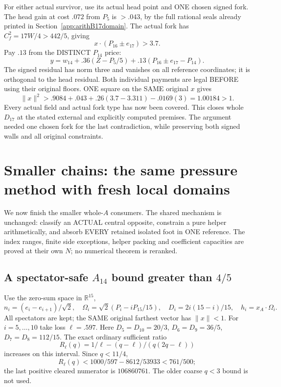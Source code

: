 \documentclass[11pt]{article}
\begin{document}
For either actual survivor, use its actual
head point and ONE chosen signed fork.
The head gain at cost \(.072\) from \(P_5\)
is \(>.043\), by the full rational seals already
printed in Section~\ref{app:arithB17domain}.
The actual fork has
\(C_f^2=17W/4>442/5\), giving
\[
                 x\cdot(P_{16}\pm e_{17})>3.7 .
\]
Pay \(.13\) from the DISTINCT \(P_{14}\) price:
\[
             y=w_{14}+.36(Z-P_5/5)
                          +.13(P_{16}\pm e_{17}-P_{14}).
\]
The signed residual has norm three and
vanishes on all reference coordinates;
it is orthogonal to the head residual.
Both individual payments are legal BEFORE
using their original floors.
ONE square on the SAME original \(x\) gives
\[
              \|x\|^2>.9084+.043+.26(3.7-3.311)-.0169(3)
                                     =1.00184>1 .
\]
Every actual field and actual fork type has
now been covered.
This closes whole \(D_{17}\) at the stated
external and explicitly computed premises.
The argument needed one chosen fork for the
last contradiction, while preserving both
signed walls and all original constraints.

\section{Smaller chains: the same pressure method with fresh local domains}
\label{app:arithsmallerchains}

We now finish the smaller whole-\(A\) consumers.
The shared mechanism is unchanged: classify an
ACTUAL central opposite, constrain a pure helper
arithmetically, and absorb EVERY retained isolated
foot in ONE reference.
The index ranges, finite side exceptions, helper
packing and coefficient capacities are proved at
their own \(N\); no numerical theorem is reranked.

\subsection{A spectator-safe \(A_{14}\) bound greater than \(4/5\)}
\label{app:arithA14fourfifths}

Use the zero-sum space in \(\mathbb R^{15}\),
\[
 n_i=(e_i-e_{i+1})/\sqrt2,\quad
 \Omega_i=\sqrt2(P_i-iP_{15}/15),\quad
 D_i=2i(15-i)/15,\quad h_i=x_A\cdot\Omega_i .
\]
All spectators are kept; the SAME original
farthest vector has \(\|x\|<1\).
For \(i=5,\ldots,10\) take loss
\(\ell=.597\).
Here \(D_5=D_{10}=20/3\),
\(D_6=D_9=36/5\), \(D_7=D_8=112/15\).
The exact ordinary sufficient ratio
\[
 R_\ell(q)=1/\ell-(q-\ell)/(q(2q-\ell))
\]
increases on this interval.
Since \(q<11/4\),
\[
 R_\ell(q)<1000/597-8612/53933<761/500 ;
\]
the last positive cleared numerator is \(106860761\).
The older coarse \(q<3\) bound is not used.
\end{document}
